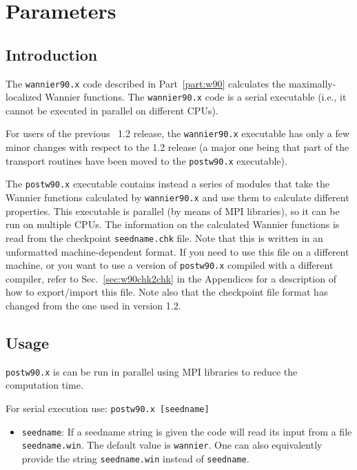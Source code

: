 \chapter{Parameters}

\section{Introduction}

The \texttt{wannier90.x} code described in Part~\ref{part:w90}
calculates the maximally-localized Wannier functions. The \texttt{wannier90.x} code is a
serial executable (i.e., it cannot be executed in parallel on different
CPUs).

For users of the previous \wannier\ 1.2 release, the
\texttt{wannier90.x} executable has only a few minor changes with
respect to the 1.2 release (a major one being that part of the
transport routines have been moved to the \texttt{postw90.x}
executable).

The \texttt{postw90.x} executable contains instead a series of modules
that take the Wannier functions calculated by \texttt{wannier90.x} and
use them to calculate different properties.  This executable is
parallel (by means of MPI libraries), so it can be run on multiple
CPUs.  The information on the calculated Wannier functions is read
from the checkpoint \verb|seedname.chk| file. Note that this is
written in an unformatted machine-dependent format. If you need to use
this file on a different machine, or you want to use a version of
\texttt{postw90.x} compiled with a different compiler, refer to
Sec.~\ref{sec:w90chk2chk} in the Appendices for a description of how
to export/import this file. Note also that the checkpoint file format has
changed from the one used in version 1.2.

\section{Usage}
{\tt postw90.x} is can be run in parallel using MPI libraries to
reduce the computation time.

For serial execution use: {\tt postw90.x [seedname]} 

\begin{itemize} \item 
{\tt seedname}: If a seedname string is given the code
will read its input from a file {\tt seedname.win}. The default
  value is {\tt wannier}. One can also equivalently provide the string
  {\tt seedname.win} instead of  {\tt seedname}.
\end{itemize}

